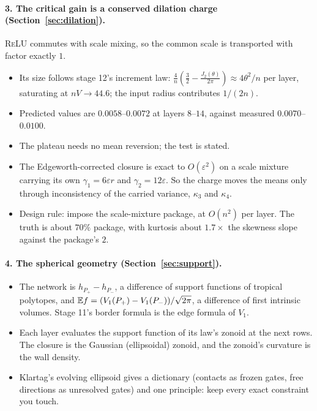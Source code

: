 \paragraph{3. The critical gain is a conserved dilation charge (Section~\ref{sec:dilation}).} \textsc{ReLU} commutes with scale
mixing, so the common scale is transported with factor exactly $1$.
\begin{itemize}[leftmargin=*]
\item Its size follows stage 12's increment law: $\frac4n(\frac32-\frac{J_2(\theta)}{2\pi})\approx4\theta^2/n$ per layer, saturating at $nV\to44.6$; the
input radius contributes $1/(2n)$.
\item Predicted values are $0.0058$--$0.0072$ at layers $8$--$14$, against measured $0.0070$--$0.0100$.
\item The plateau needs no mean reversion; the test is stated.
\item The Edgeworth-corrected closure is exact to $O(\varepsilon^2)$ on a scale mixture carrying its own $\gamma_1=6\varepsilon r$ and
$\gamma_2=12\varepsilon$. So the charge moves the means only through inconsistency of the carried variance, $\kappa_3$ and $\kappa_4$.
\item Design rule: impose the scale-mixture package, at $O(n^2)$ per layer. The truth is about $70\%$ package, with kurtosis about
$1.7\times$ the skewness slope against the package's $2$.
\end{itemize}

\paragraph{4. The spherical geometry (Section~\ref{sec:support}).}
\begin{itemize}[leftmargin=*]
\item The network is $h_{P_+}-h_{P_-}$, a difference of support functions of tropical polytopes, and $\mathbb E f=(V_1(P_+)-V_1(P_-))/\sqrt{2\pi}$, a
difference of first intrinsic volumes. Stage 11's border formula is the edge formula of $V_1$.
\item Each layer evaluates the support function of its law's zonoid at the next rows. The closure is the Gaussian (ellipsoidal)
zonoid, and the zonoid's curvature is the wall density.
\item Klartag's evolving ellipsoid gives a dictionary (contacts as frozen gates, free directions as unresolved gates) and one
principle: keep every exact constraint you touch.
\end{itemize}

